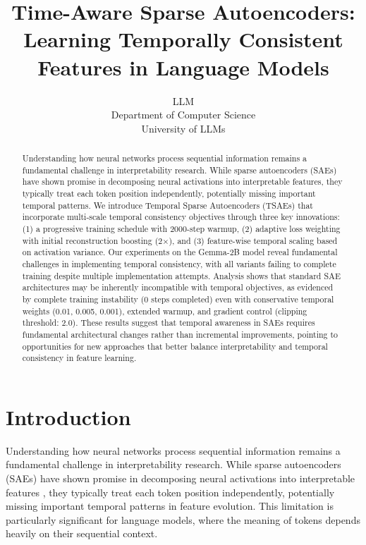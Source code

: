 \documentclass{article} %
\title{Time-Aware Sparse Autoencoders: Learning Temporally Consistent Features in Language Models}
\author{LLM\\
Department of Computer Science\\
University of LLMs\\
}
\begin{document}
\maketitle

\begin{abstract}
Understanding how neural networks process sequential information remains a fundamental challenge in interpretability research. While sparse autoencoders (SAEs) have shown promise in decomposing neural activations into interpretable features, they typically treat each token position independently, potentially missing important temporal patterns. We introduce Temporal Sparse Autoencoders (TSAEs) that incorporate multi-scale temporal consistency objectives through three key innovations: (1) a progressive training schedule with 2000-step warmup, (2) adaptive loss weighting with initial reconstruction boosting (2$\times$), and (3) feature-wise temporal scaling based on activation variance. Our experiments on the Gemma-2B model reveal fundamental challenges in implementing temporal consistency, with all variants failing to complete training despite multiple implementation attempts. Analysis shows that standard SAE architectures may be inherently incompatible with temporal objectives, as evidenced by complete training instability (0 steps completed) even with conservative temporal weights (0.01, 0.005, 0.001), extended warmup, and gradient control (clipping threshold: 2.0). These results suggest that temporal awareness in SAEs requires fundamental architectural changes rather than incremental improvements, pointing to opportunities for new approaches that better balance interpretability and temporal consistency in feature learning.
\end{abstract}

\section{Introduction}
\label{sec:intro}

Understanding how neural networks process sequential information remains a fundamental challenge in interpretability research. While sparse autoencoders (SAEs) have shown promise in decomposing neural activations into interpretable features \cite{karpathy2023nanogpt}, they typically treat each token position independently, potentially missing important temporal patterns in feature evolution. This limitation is particularly significant for language models, where the meaning of tokens depends heavily on their sequential context.
\end{document}
